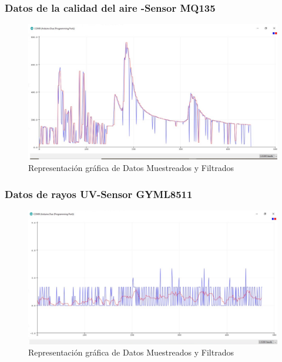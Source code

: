 \documentclass[10pt,a4paper]{article}
\begin{document}
\begin{multicols}{2}
\begin{itemize}
\subsubsection{Datos de la calidad del aire -Sensor MQ135}
\begin{figure}[H]
\centering
\includegraphics[scale=0.30]{gaussm135.PNG}
\caption{Representación gráfica de Datos Muestreados y Filtrados}
\end{figure}





\subsubsection{Datos de rayos UV-Sensor GYML8511}

\begin{figure}[H]
\centering
\includegraphics[scale=0.30]{gaussuv.PNG}
\caption{Representación gráfica de Datos Muestreados y Filtrados}
\end{figure}


\end{itemize}
\end{multicols}
\end{document}
